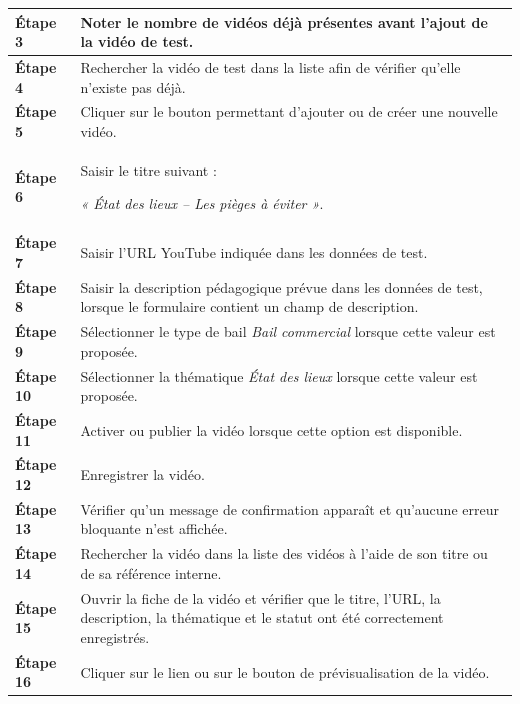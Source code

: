 \begin{longtable}{
    |>{\raggedright\arraybackslash}p{}
    |>{\raggedright\arraybackslash}p{}|
}
\textbf{Étape 3}
&
Noter le nombre de vidéos déjà présentes avant l'ajout de la vidéo de test.
\\
\hline

\textbf{Étape 4}
&
Rechercher la vidéo de test dans la liste afin de vérifier qu'elle n'existe
pas déjà.
\\
\hline

\textbf{Étape 5}
&
Cliquer sur le bouton permettant d'ajouter ou de créer une nouvelle vidéo.
\\
\hline

\textbf{Étape 6}
&
Saisir le titre suivant :

\textit{« État des lieux -- Les pièges à éviter »}.
\\
\hline

\textbf{Étape 7}
&
Saisir l'URL YouTube indiquée dans les données de test.
\\
\hline

\textbf{Étape 8}
&
Saisir la description pédagogique prévue dans les données de test, lorsque
le formulaire contient un champ de description.
\\
\hline

\textbf{Étape 9}
&
Sélectionner le type de bail \textit{Bail commercial} lorsque cette valeur
est proposée.
\\
\hline

\textbf{Étape 10}
&
Sélectionner la thématique \textit{État des lieux} lorsque cette valeur est
proposée.
\\
\hline

\textbf{Étape 11}
&
Activer ou publier la vidéo lorsque cette option est disponible.
\\
\hline

\textbf{Étape 12}
&
Enregistrer la vidéo.
\\
\hline

\textbf{Étape 13}
&
Vérifier qu'un message de confirmation apparaît et qu'aucune erreur
bloquante n'est affichée.
\\
\hline

\textbf{Étape 14}
&
Rechercher la vidéo dans la liste des vidéos à l'aide de son titre ou de sa
référence interne.
\\
\hline

\textbf{Étape 15}
&
Ouvrir la fiche de la vidéo et vérifier que le titre, l'URL, la description,
la thématique et le statut ont été correctement enregistrés.
\\
\hline

\textbf{Étape 16}
&
Cliquer sur le lien ou sur le bouton de prévisualisation de la vidéo.
\\
\hline


\end{longtable}
